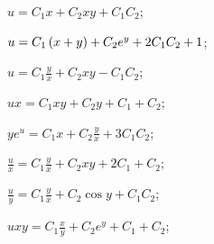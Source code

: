 \begin{enumsols}
		\label{sol:charpit_clauret:multivar_changes}
		\item \( u = C_1 x + C_2 xy + C_1 C_2 \); \sfill %
		\item \( u = C_1 \left( x + y \right) + C_2 e^y + 2 C_1 C_2 + 1 \); \sfill %
		\item \( u = C_1 \frac{y}{x} + C_2 xy - C_1 C_2 \); \sfill %
		\item \( ux = C_1 xy + C_2 y + C_1 + C_2 \); \sfill %
		\item \( ye^u = C_1 x + C_2 \frac{y}{x} + 3 C_1 C_2 \); \sfill %
		\item \( \frac{u}{x} = C_1 \frac{y}{x} + C_2 xy + 2 C_1 + C_2 \); \sfill %
		\item \( \frac{u}{y} = C_1 \frac{y}{x} + C_2 \cos{y} + C_1 C_2 \); \sfill %
		\item \( uxy = C_1 \frac{x}{y} + C_2 e^y + C_1 + C_2 \); \sfill %

	\end{enumsols}